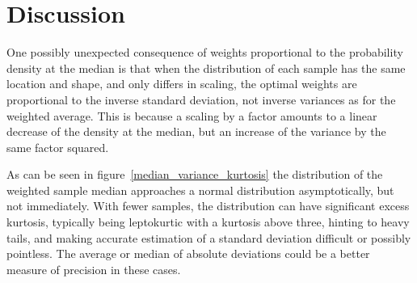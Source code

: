 \documentclass[ejs]{imsart}
\numberwithin{equation}{section}
\theoremstyle{plain}
\begin{document}

\section{Discussion}



One possibly unexpected consequence of weights proportional to the probability density at the median is that when the distribution of each sample has the same location and shape, and only differs in scaling, the optimal weights are proportional to the inverse standard deviation, not inverse variances as for the weighted average.
This is because a scaling by a factor amounts to a linear decrease of the density at the median, but an increase of the variance by the same factor squared.

As can be seen in figure~\ref{median_variance_kurtosis} the distribution of the weighted sample median approaches a normal distribution asymptotically, but not immediately.
With fewer samples, the distribution can have significant excess kurtosis, typically being leptokurtic with a kurtosis above three, hinting to heavy tails, and making accurate estimation of a standard deviation difficult or possibly pointless.
The average or median of absolute deviations could be a better measure of precision in these cases.

\end{document}
